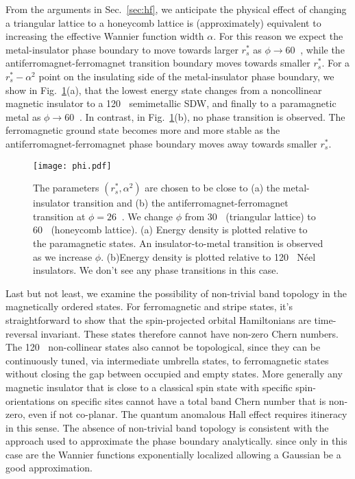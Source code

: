 \documentclass[%
 reprint,
 superscriptaddress,
 amsmath,amssymb,
 aps,
 prx,
 floatfix,
]{revtex4-2}
\newcommand{\<}{\langle}
\renewcommand{\>}{\rangle}
\renewcommand{\(}{\left(}
\renewcommand{\)}{\right)}
\renewcommand{\[}{\left[}
\renewcommand{\]}{\right]}
\DeclareMathOperator{\degree}{^{\circ}}
\begin{document}
From the arguments in Sec.~\ref{sec:hf}, we anticipate the physical effect of changing a triangular lattice to a honeycomb lattice is (approximately) equivalent to increasing the effective Wannier function width $\alpha$.  For this reason we expect the
metal-insulator phase boundary to move towards larger $r_s^*$ as $\phi \to 60\degree$, 
while the antiferromagnet-ferromagnet transition boundary moves towards smaller $r_s^*$.  
For a $r_s^*-\alpha^2$ point on the insulating side of the metal-insulator phase boundary,
we show in Fig.~\ref{fig:phi}(a), that the lowest energy state changes from a noncollinear magnetic 
insulator to a 120$\degree$ semimetallic SDW, and finally to a paramagnetic metal as $\phi \to 60 \degree$.
In contrast, in Fig.~\ref{fig:phi}(b), no phase transition is observed. The ferromagnetic ground state becomes more and more stable as the 
antiferromagnet-ferromagnet phase boundary moves away towards smaller $r_s^*$.  

\begin{figure}[t]
    \centering
    \texttt{[image: phi.pdf]}
    \caption{The parameters $(r_s^*, \alpha^2)$ are chosen to be close to (a) the metal-insulator transition and (b) the antiferromagnet-ferromagnet transition at $\phi=26\degree$. We change $\phi$ from $30\degree$ (triangular lattice) to $60\degree$ (honeycomb lattice). (a) Energy density is plotted relative to the paramagnetic states. An insulator-to-metal transition is observed as we increase $\phi$. (b)Energy density is plotted relative to 120$\degree$ N\'eel insulators. We don't see any
    phase transitions in this case.}
    \label{fig:phi}
\end{figure}

Last but not least, we examine the possibility of non-trivial band topology in the magnetically ordered states. 
For ferromagnetic and stripe states, it's straightforward to show that the spin-projected orbital Hamiltonians are time-reversal 
invariant.  These states therefore cannot have non-zero Chern numbers. 
The 120$\degree$ non-collinear states also cannot be topological,
since they can be continuously tuned, via intermediate umbrella states, to ferromagnetic states
without closing the gap between occupied and empty states.  More generally any magnetic insulator
that is close to a classical spin state with specific spin-orientations on specific sites cannot have 
a total band Chern number that is non-zero, even if not co-planar.  The quantum anomalous Hall effect
requires itineracy in this sense. The absence of non-trivial band topology is consistent with 
the approach used to approximate the phase boundary analytically. since only in this case are the Wannier functions 
exponentially localized allowing a Gaussian be a good approximation.
\end{document}
